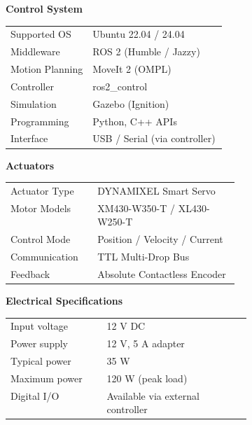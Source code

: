 \documentclass[a4paper,landscape,10pt]{article}
\newcommand{\sectitle}[1]{
    \vspace{0.4cm}
    \colorbox{rowcolor}{
        \parbox{\linewidth}{
            \textbf{\textcolor{maincolor}{#1}}
        }
    }
    \vspace{0.2cm}
}
\begin{document}
\begin{multicols}{3}
\vfill\null
\pagebreak

\sectitle{Control System}

\colorbox{rowcolor}{
\parbox{\linewidth}{
\begin{tabularx}{\linewidth}{>{\raggedright\arraybackslash}p{0.38\linewidth} X}
Supported OS & Ubuntu 22.04 / 24.04 \\
Middleware & ROS 2 (Humble / Jazzy) \\
Motion Planning & MoveIt 2 (OMPL) \\
Controller & ros2\_control \\
Simulation & Gazebo (Ignition) \\
Programming & Python, C++ APIs \\
Interface & USB / Serial (via controller) \\
\end{tabularx}
}
}

\sectitle{Actuators}

\colorbox{rowcolor}{
\parbox{\linewidth}{
\begin{tabularx}{\linewidth}{>{\raggedright\arraybackslash}p{0.38\linewidth} X}
Actuator Type & DYNAMIXEL Smart Servo \\
Motor Models & XM430-W350-T / XL430-W250-T \\
Control Mode & Position / Velocity / Current \\
Communication & TTL Multi-Drop Bus \\
Feedback & Absolute Contactless Encoder \\
\end{tabularx}
}
}

\sectitle{Electrical Specifications}

\colorbox{rowcolor}{
\parbox{\linewidth}{
\begin{tabularx}{\linewidth}{>{\raggedright\arraybackslash}p{0.4\linewidth} X}
Input voltage & 12 V DC \\
Power supply & 12 V, 5 A adapter \\
Typical power & 35 W \\
Maximum power & 120 W (peak load) \\
Digital I/O & Available via external controller\\
\end{tabularx}
}
}


\end{multicols}
\end{document}
